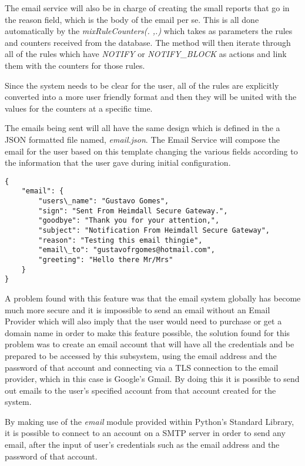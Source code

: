 The email service will also be in charge of creating the small reports that go
in the reason field, which is the body of the email per se. This is all done
automatically by the \emph{mixRuleCounters(. ,.)} which takes as parameters the
rules and counters received from the database. The method will then iterate
through all of the rules which have \emph{NOTIFY} or \emph{NOTIFY\_BLOCK} as
actions and link them with the counters for those rules.

Since the system needs to be clear for the user, all of the rules are explicitly
converted into a more user friendly format and then they will be united with the
values for the counters at a specific time.


The emails being sent will all have the same design which is defined in the a
JSON formatted file named, \emph{email.json}. The Email Service will compose the
email for the user based on this template changing the various fields according
to the information that the user gave during initial configuration.

\begin{lstlisting}[caption=Example of the email JSON template.]
{
    "email": {
        "users\_name": "Gustavo Gomes",
        "sign": "Sent From Heimdall Secure Gateway.",
        "goodbye": "Thank you for your attention,",
        "subject": "Notification From Heimdall Secure Gateway",
        "reason": "Testing this email thingie",
        "email\_to": "gustavofrgomes@hotmail.com",
        "greeting": "Hello there Mr/Mrs"
    }
}
\end{lstlisting}

A problem found with this feature was that the email system globally has become
much more secure and it is impossible to send an email without an Email Provider
which will also imply that the user would need to purchase or get a domain name
in order to make this feature possible, the solution found for this problem was
to create an email account that will have all the credentials and be prepared to
be accessed by this subsystem, using the email address and the password of that
account and connecting via a TLS connection to the email provider, which in this
case is Google's Gmail. By doing this it is possible to send out emails to the
user's specified account from that account created for the system.

By making use of the \emph{email} module provided within Python's Standard
Library, it is possible to connect to an account on a SMTP server in order to
send any email, after the input of user's credentials such as the email address
and the password of that account.

